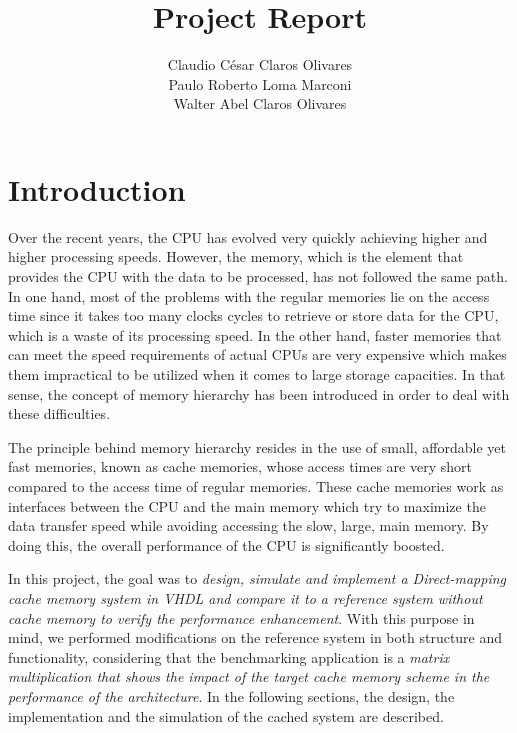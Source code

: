 \documentclass[]{article}
\title{Project Report}
\author{Claudio C\'esar Claros Olivares\\Paulo Roberto Loma Marconi\\Walter Abel Claros Olivares}
\begin{document}
\maketitle
{}

\section{Introduction}

Over the recent years, the CPU has evolved very quickly achieving higher and higher processing speeds. However, the memory, which is the element that provides the CPU with the data to be processed, has not followed the same path. In one hand, most of the problems with the regular memories lie on the access time since it takes too many clocks cycles to retrieve or store data for the CPU, which is a waste of its processing speed. In the other hand, faster memories that can meet the speed requirements of actual CPUs are very expensive which makes them impractical to be utilized when it comes to large storage capacities. In that sense, the concept of memory hierarchy has been introduced in order to deal with these difficulties.

The principle behind memory hierarchy resides in the use of small, affordable yet fast memories, known as cache memories, whose access times are very short compared to the access time of regular memories. These cache memories work as interfaces between the CPU and the main memory which try to maximize the data transfer speed while avoiding accessing the slow, large, main memory. By doing this, the overall performance of the CPU is significantly boosted. 

In this project, the goal was to \textit{design, simulate and implement a Direct-mapping cache memory system in VHDL and compare it to a reference system without cache memory to verify the performance enhancement}. With this purpose in mind, we performed modifications on the reference system in both structure and functionality, considering that the benchmarking application is a \textit{matrix multiplication that shows the impact of the target cache memory scheme in the performance of the architecture}. In the following sections, the design, the implementation and the simulation of the cached system are described.
\end{document}
